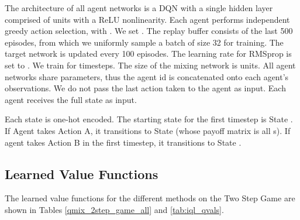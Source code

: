 \documentclass{article}
\begin{document}
The architecture of all agent networks is a DQN with a single hidden layer comprised of  units with a ReLU nonlinearity. Each agent performs independent  greedy action selection, with . We set . The replay buffer consists of the last 500 episodes, from which we uniformly sample a batch of size 32 for training. The target network is updated every 100 episodes. The learning rate for RMSprop is set to . We train for  timesteps. The size of the mixing network is  units. All agent networks share parameters, thus the agent id is concatenated onto each agent's observations. We do not pass the last action taken to the agent as input. Each agent receives the full state as input.

Each state is one-hot encoded. The starting state for the first timestep is State . If Agent  takes Action A, it transitions to State  (whose payoff matrix is all s). If agent  takes Action B in the first timestep, it transitions to State . 

\subsection{Learned Value Functions}

The learned value functions for the different methods on the Two Step Game are shown in Tables \ref{qmix_2step_game_all} and \ref{tab:iql_qvals}. 
\end{document}
